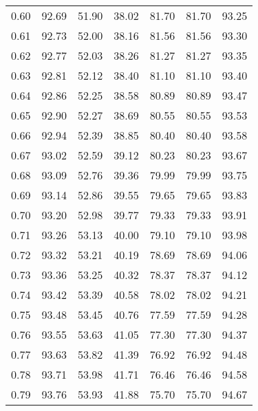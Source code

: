 \begin{tabular}{|c|c|c|c|c|c|c|}
      0.60 &     92.69 &     51.90 &      38.02 &   81.70 &      81.70 &         93.25 \\
      0.61 &     92.73 &     52.00 &      38.16 &   81.56 &      81.56 &         93.30 \\
      0.62 &     92.77 &     52.03 &      38.26 &   81.27 &      81.27 &         93.35 \\
      0.63 &     92.81 &     52.12 &      38.40 &   81.10 &      81.10 &         93.40 \\
      0.64 &     92.86 &     52.25 &      38.58 &   80.89 &      80.89 &         93.47 \\
      0.65 &     92.90 &     52.27 &      38.69 &   80.55 &      80.55 &         93.53 \\
      0.66 &     92.94 &     52.39 &      38.85 &   80.40 &      80.40 &         93.58 \\
      0.67 &     93.02 &     52.59 &      39.12 &   80.23 &      80.23 &         93.67 \\
      0.68 &     93.09 &     52.76 &      39.36 &   79.99 &      79.99 &         93.75 \\
      0.69 &     93.14 &     52.86 &      39.55 &   79.65 &      79.65 &         93.83 \\
      0.70 &     93.20 &     52.98 &      39.77 &   79.33 &      79.33 &         93.91 \\
      0.71 &     93.26 &     53.13 &      40.00 &   79.10 &      79.10 &         93.98 \\
      0.72 &     93.32 &     53.21 &      40.19 &   78.69 &      78.69 &         94.06 \\
      0.73 &     93.36 &     53.25 &      40.32 &   78.37 &      78.37 &         94.12 \\
      0.74 &     93.42 &     53.39 &      40.58 &   78.02 &      78.02 &         94.21 \\
      0.75 &     93.48 &     53.45 &      40.76 &   77.59 &      77.59 &         94.28 \\
      0.76 &     93.55 &     53.63 &      41.05 &   77.30 &      77.30 &         94.37 \\
      0.77 &     93.63 &     53.82 &      41.39 &   76.92 &      76.92 &         94.48 \\
      0.78 &     93.71 &     53.98 &      41.71 &   76.46 &      76.46 &         94.58 \\
      0.79 &     93.76 &     53.93 &      41.88 &   75.70 &      75.70 &         94.67 \\

\end{tabular}
